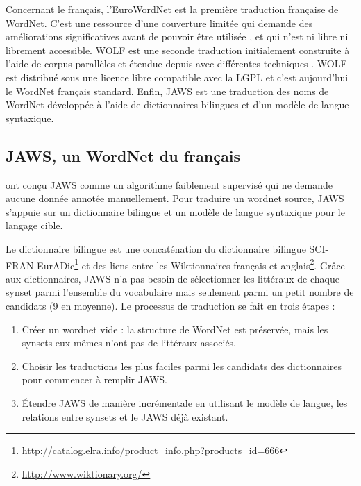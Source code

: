 Concernant le français, l'EuroWordNet \citep{vossen1998eurowordnet} est la
première traduction française de WordNet. C'est une ressource d'une couverture
limitée qui demande des améliorations significatives avant de pouvoir être
utilisée \citep{jacquin2006systemes}, et qui n'est ni libre ni librement
accessible. WOLF est une seconde traduction initialement construite à l'aide de
corpus parallèles \citep{sagot2008construction} et étendue depuis avec
différentes techniques \citep{apidianaki2012applying}. WOLF est distribué sous
une licence libre compatible avec la LGPL et c'est aujourd'hui le WordNet
français standard. Enfin, JAWS \citep{mouton2010jaws} est une traduction des
noms de WordNet développée à l'aide de dictionnaires bilingues et d'un modèle
de langue syntaxique.

\subsection{JAWS, un WordNet du français}
\label{subsec:translation_process}

\cite{mouton2010jaws} ont conçu JAWS comme un algorithme faiblement supervisé
qui ne demande aucune donnée annotée manuellement. Pour traduire un wordnet
source, JAWS s'appuie sur un dictionnaire bilingue et un modèle de langue
syntaxique pour le langage cible.

Le dictionnaire bilingue est une concaténation du dictionnaire bilingue
SCI-FRAN-EurADic\footnote{\url{http://catalog.elra.info/product_info.php?products_id=666}}
et des liens entre les Wiktionnaires français et
anglais\footnote{\url{http://www.wiktionary.org/}}. %
Grâce aux dictionnaires, JAWS n'a pas besoin de sélectionner les littéraux de chaque synset parmi l'ensemble du vocabulaire mais seulement parmi un petit nombre de candidats (9 en moyenne). Le processus de traduction se fait en trois étapes :
\begin{enumerate}
    \item Créer un wordnet vide : la structure de WordNet est préservée, mais les synsets eux-mêmes n'ont pas de littéraux associés.
    \item Choisir les traductions les plus faciles parmi les candidats des dictionnaires pour commencer à remplir JAWS.
    \item Étendre JAWS de manière incrémentale en utilisant le modèle de langue, les relations entre synsets et le JAWS déjà existant.
\end{enumerate}

